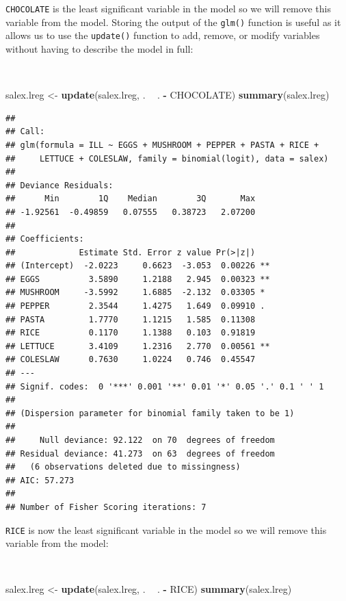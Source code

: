 \documentclass[12pt,a4paper]{book}
\newenvironment{Shaded}{\begin{snugshade}}{\end{snugshade}}
\newcommand{\KeywordTok}[1]{\textcolor[rgb]{0.13,0.29,0.53}{\textbf{#1}}}
\newcommand{\StringTok}[1]{\textcolor[rgb]{0.31,0.60,0.02}{#1}}
\newcommand{\OperatorTok}[1]{\textcolor[rgb]{0.81,0.36,0.00}{\textbf{#1}}}
\newcommand{\NormalTok}[1]{#1}
\theoremstyle{definition}
\theoremstyle{definition}
\theoremstyle{definition}
\theoremstyle{remark}
\begin{document}
\newpage

\texttt{CHOCOLATE} is the least significant variable in the model so we
will remove this variable from the model. Storing the output of the
\texttt{glm()} function is useful as it allows us to use the
\texttt{update()} function to add, remove, or modify variables without
having to describe the model in full:

~

\begin{Shaded}
\begin{Highlighting}[]
\NormalTok{salex.lreg <-}\StringTok{ }\KeywordTok{update}\NormalTok{(salex.lreg, . }\OperatorTok{~}\StringTok{ }\NormalTok{. }\OperatorTok{-}\StringTok{ }\NormalTok{CHOCOLATE)}
\KeywordTok{summary}\NormalTok{(salex.lreg)}
\end{Highlighting}
\end{Shaded}

\begin{verbatim}
## 
## Call:
## glm(formula = ILL ~ EGGS + MUSHROOM + PEPPER + PASTA + RICE + 
##     LETTUCE + COLESLAW, family = binomial(logit), data = salex)
## 
## Deviance Residuals: 
##      Min        1Q    Median        3Q       Max  
## -1.92561  -0.49859   0.07555   0.38723   2.07200  
## 
## Coefficients:
##             Estimate Std. Error z value Pr(>|z|)   
## (Intercept)  -2.0223     0.6623  -3.053  0.00226 **
## EGGS          3.5890     1.2188   2.945  0.00323 **
## MUSHROOM     -3.5992     1.6885  -2.132  0.03305 * 
## PEPPER        2.3544     1.4275   1.649  0.09910 . 
## PASTA         1.7770     1.1215   1.585  0.11308   
## RICE          0.1170     1.1388   0.103  0.91819   
## LETTUCE       3.4109     1.2316   2.770  0.00561 **
## COLESLAW      0.7630     1.0224   0.746  0.45547   
## ---
## Signif. codes:  0 '***' 0.001 '**' 0.01 '*' 0.05 '.' 0.1 ' ' 1
## 
## (Dispersion parameter for binomial family taken to be 1)
## 
##     Null deviance: 92.122  on 70  degrees of freedom
## Residual deviance: 41.273  on 63  degrees of freedom
##   (6 observations deleted due to missingness)
## AIC: 57.273
## 
## Number of Fisher Scoring iterations: 7
\end{verbatim}

\newpage

\texttt{RICE} is now the least significant variable in the model so we
will remove this variable from the model:

~

\begin{Shaded}
\begin{Highlighting}[]
\NormalTok{salex.lreg <-}\StringTok{ }\KeywordTok{update}\NormalTok{(salex.lreg, . }\OperatorTok{~}\StringTok{ }\NormalTok{. }\OperatorTok{-}\StringTok{ }\NormalTok{RICE)}
\KeywordTok{summary}\NormalTok{(salex.lreg)}
\end{Highlighting}
\end{Shaded}
\end{document}
